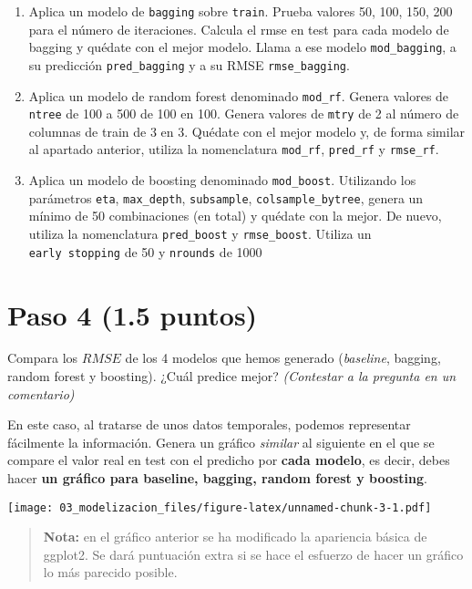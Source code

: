 \documentclass[]{article}
\begin{document}
\begin{enumerate}
\def\labelenumi{\arabic{enumi}.}
\item
  Aplica un modelo de \texttt{bagging} sobre \texttt{train}. Prueba
  valores 50, 100, 150, 200 para el número de iteraciones. Calcula el
  rmse en test para cada modelo de bagging y quédate con el mejor
  modelo. Llama a ese modelo \texttt{mod\_bagging}, a su predicción
  \texttt{pred\_bagging} y a su RMSE \texttt{rmse\_bagging}.
\item
  Aplica un modelo de random forest denominado \texttt{mod\_rf}. Genera
  valores de \texttt{ntree} de 100 a 500 de 100 en 100. Genera valores
  de \texttt{mtry} de 2 al número de columnas de train de 3 en 3.
  Quédate con el mejor modelo y, de forma similar al apartado anterior,
  utiliza la nomenclatura \texttt{mod\_rf}, \texttt{pred\_rf} y
  \texttt{rmse\_rf}.
\item
  Aplica un modelo de boosting denominado \texttt{mod\_boost}.
  Utilizando los parámetros \texttt{eta}, \texttt{max\_depth},
  \texttt{subsample}, \texttt{colsample\_bytree}, genera un mínimo de 50
  combinaciones (en total) y quédate con la mejor. De nuevo, utiliza la
  nomenclatura \texttt{pred\_boost} y \texttt{rmse\_boost}. Utiliza un
  \texttt{early\ stopping} de 50 y \texttt{nrounds} de 1000
\end{enumerate}

\hypertarget{paso-4-1.5-puntos}{%
\section{Paso 4 (1.5 puntos)}\label{paso-4-1.5-puntos}}

Compara los \(RMSE\) de los 4 modelos que hemos generado
(\emph{baseline}, bagging, random forest y boosting). ¿Cuál predice
mejor? \emph{(Contestar a la pregunta en un comentario)}

En este caso, al tratarse de unos datos temporales, podemos representar
fácilmente la información. Genera un gráfico \emph{similar} al siguiente
en el que se compare el valor real en test con el predicho por
\textbf{cada modelo}, es decir, debes hacer \textbf{un gráfico para
baseline, bagging, random forest y boosting}.

\texttt{[image: 03\_modelizacion\_files/figure-latex/unnamed-chunk-3-1.pdf]}

\begin{quote}
\textbf{Nota:} en el gráfico anterior se ha modificado la apariencia
básica de ggplot2. Se dará puntuación extra si se hace el esfuerzo de
hacer un gráfico lo más parecido posible.
\end{quote}
\end{document}
